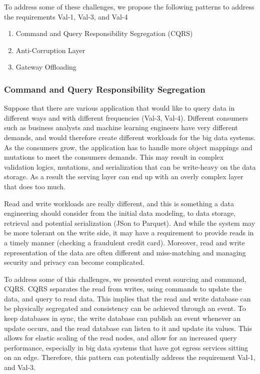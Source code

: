 \documentclass[conference]{IEEEtran}
\begin{document}
To address some of these challenges, we propose the following patterns to address the requirements Val-1, Val-3, and Val-4

\begin{enumerate}
    \item Command and Query Responsibility Segregation (CQRS)
    \item Anti-Corruption Layer 
    \item Gateway Offloading 
\end{enumerate}

\subsubsection{Command and Query Responsibility Segregation}

Suppose that there are various application that would like to query data in different ways and with different frequencies (Val-3, Val-4). Different consumers such as business analysts and machine learning engineers have very different demands, and would therefore create different workloads for the big data systems. As the consumers grow, the application has to handle more object mappings and mutations to meet the consumers demands. This may result in complex validation logics, mutations, and serialization that can be write-heavy on the data storage. As a result the serving layer can end up with an overly complex layer that does too much. 

Read and write workloads are really different, and this is something a data engineering should consider from the initial data modeling, to data storage, retrieval and potential serialization (JSon to Parquet). And while the system may be more tolerant on the write side, it may have a requirement to provide reads in a timely manner (checking a fraudulent credit card). Moreover, read and write representation of the data are often different and miss-matching and managing security and privacy can become complicated. 

To address some of this challenges, we presented event sourcing and command, CQRS. CQRS separates the read from writes, using commands to update the data, and query to read data. This implies that the read and write database can be physically segregated and consistency can be achieved through an event. To keep databases in sync, the write database can publish an event whenever an update occurs, and the read database can listen to it and update its values. This allows for elastic scaling of the read nodes, and allow for an increased query performance, especially in big data systems that have got egress services sitting on an edge. Therefore, this pattern can potentially address the requirement Val-1, and Val-3. 
\end{document}
